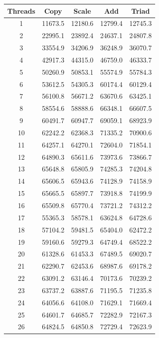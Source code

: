 \documentclass[12pt,a4paper,USenglish]{article}      %
\begin{document}
\begin{table}[!hbtp]
\begin{tabular}{ |c|c|c|c|c| }
\hline
Threads & Copy & Scale & Add & Triad \\
\hline
1 & 11673.5 & 12180.6 & 12799.4 & 12745.3 \\
\hline
2 & 22995.1 & 23892.4 & 24637.1 & 24807.8 \\
\hline
3 & 33554.9 & 34206.9 & 36248.9 & 36070.7 \\
\hline
4 & 42917.3 & 44315.0 & 46759.0 & 46333.7 \\
\hline
5 & 50260.9 & 50853.1 & 55574.9 & 55784.3 \\
\hline
6 & 53612.5 & 54305.3 & 60174.4 & 60129.4 \\
\hline
7 & 56100.8 & 56671.2 & 63670.6 & 63425.1 \\
\hline
8 & 58554.6 & 58888.6 & 66348.1 & 66607.5 \\
\hline
9 & 60491.7 & 60947.7 & 69059.1 & 68923.9 \\
\hline
10 & 62242.2 & 62368.3 & 71335.2 & 70900.6 \\
\hline
11 & 64257.1 & 64270.1 & 72604.0 & 71854.1 \\
\hline
12 & 64890.3 & 65611.6 & 73973.6 & 73866.7 \\
\hline
13 & 65648.8 & 65805.9 & 74285.3 & 74204.8 \\
\hline
14 & 65606.5 & 65943.6 & 74128.9 & 74158.9 \\
\hline
15 & 65665.5 & 65897.7 & 73918.8 & 74199.9 \\
\hline
16 & 65509.8 & 65770.4 & 73721.2 & 74312.2 \\
\hline
17 & 55365.3 & 58578.1 & 63624.8 & 64728.6 \\
\hline
18 & 57104.2 & 59481.5 & 65404.0 & 62472.2 \\
\hline
19 & 59160.6 & 59279.3 & 64749.4 & 68522.2 \\
\hline
20 & 61328.6 & 61453.3 & 67489.5 & 69020.7 \\
\hline
21 & 62290.7 & 62453.6 & 68987.6 & 69178.2 \\
\hline
22 & 63091.2 & 63146.4 & 70173.6 & 70239.2 \\
\hline
23 & 63737.2 & 63887.6 & 71195.5 & 71235.8 \\
\hline
24 & 64056.6 & 64108.0 & 71629.1 & 71669.4 \\
\hline
25 & 64601.7 & 64685.7 & 72282.9 & 72167.3 \\
\hline
26 & 64824.5 & 64850.8 & 72729.4 & 72623.9 \\

\end{tabular}
\end{table}
\end{document}

